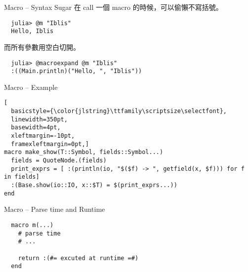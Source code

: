 \documentclass[14pt]{beamer}
\begin{document}
\begin{frame}[fragile]{Macro -- Syntax Sugar}
  在 call 一個 macro 的時候，可以偷懶不寫括號。

\begin{lstlisting}
  julia> @m "Iblis"
  Hello, Iblis
\end{lstlisting}

  而所有參數用空白切開。

  \pause

\begin{lstlisting}
  julia> @macroexpand @m "Iblis"
  :((Main.println)("Hello, ", "Iblis"))
\end{lstlisting}
\end{frame}


\begin{frame}[fragile]{Macro -- Example}

\begin{lstlisting}[
  basicstyle={\color{jlstring}\ttfamily\scriptsize\selectfont},
  linewidth=350pt,
  basewidth=4pt,
  xleftmargin=-10pt,
  framexleftmargin=0pt,]
macro make_show(T::Symbol, fields::Symbol...)
  fields = QuoteNode.(fields)
  print_exprs = [ :(println(io, "$($f) -> ", getfield(x, $f))) for f in fields]
  :(Base.show(io::IO, x::$T) = $(print_exprs...))
end
\end{lstlisting}
\end{frame}


\begin{frame}[fragile]{Macro -- Parse time and Runtime}

\begin{lstlisting}
  macro m(...)
    # parse time
    # ...

    return :(#= excuted at runtime =#)
  end
\end{lstlisting}
\end{frame}
\end{document}
